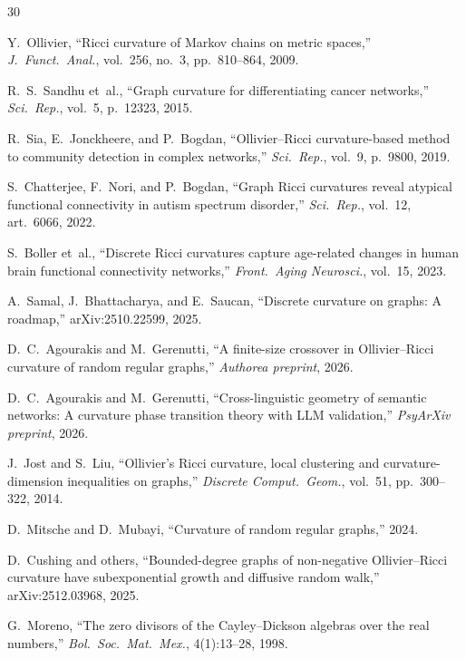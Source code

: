 \documentclass[11pt,a4paper]{article}
\begin{document}

\begin{thebibliography}{30}

Y.~Ollivier,
``Ricci curvature of Markov chains on metric spaces,''
\emph{J.~Funct.~Anal.}, vol.~256, no.~3, pp.~810--864, 2009.

R.~S.~Sandhu et~al.,
``Graph curvature for differentiating cancer networks,''
\emph{Sci.~Rep.}, vol.~5, p.~12323, 2015.

R.~Sia, E.~Jonckheere, and P.~Bogdan,
``Ollivier--Ricci curvature-based method to community detection in complex networks,''
\emph{Sci.~Rep.}, vol.~9, p.~9800, 2019.

S.~Chatterjee, F.~Nori, and P.~Bogdan,
``Graph Ricci curvatures reveal atypical functional connectivity in autism spectrum disorder,''
\emph{Sci.~Rep.}, vol.~12, art.~6066, 2022.

S.~Boller et~al.,
``Discrete Ricci curvatures capture age-related changes in human brain functional connectivity networks,''
\emph{Front.\ Aging Neurosci.}, vol.~15, 2023.

A.~Samal, J.~Bhattacharya, and E.~Saucan,
``Discrete curvature on graphs: A roadmap,''
arXiv:2510.22599, 2025.

D.~C.~Agourakis and M.~Gerenutti,
``A finite-size crossover in Ollivier--Ricci curvature of random regular graphs,''
\emph{Authorea preprint}, 2026.

D.~C.~Agourakis and M.~Gerenutti,
``Cross-linguistic geometry of semantic networks: A curvature phase transition theory with LLM validation,''
\emph{PsyArXiv preprint}, 2026.

J.~Jost and S.~Liu,
``Ollivier's Ricci curvature, local clustering and curvature-dimension inequalities on graphs,''
\emph{Discrete Comput.\ Geom.}, vol.~51, pp.~300--322, 2014.

D.~Mitsche and D.~Mubayi,
``Curvature of random regular graphs,'' 2024.

D.~Cushing and others,
``Bounded-degree graphs of non-negative Ollivier--Ricci curvature have subexponential growth and diffusive random walk,''
arXiv:2512.03968, 2025.

G.~Moreno,
``The zero divisors of the Cayley--Dickson algebras over the real numbers,''
\emph{Bol.~Soc.~Mat.~Mex.}, 4(1):13--28, 1998.


\end{thebibliography}
\end{document}
